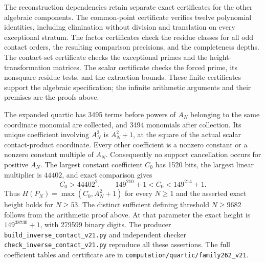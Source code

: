 \documentclass[11pt,a4paper]{article}
\begin{document}
The reconstruction dependencies retain separate exact certificates
for the other algebraic components. The common-point certificate
verifies twelve polynomial identities, including elimination without
division and translation on every exceptional stratum. The factor
certificates check the residue classes for all odd contact orders,
the resulting comparison precisions, and the completeness depths.
The contact-set certificate checks the exceptional primes and the
height-transformation matrices. The scalar certificate checks the
forced prime, its nonsquare residue tests, and the extraction bounds.
These finite certificates support the algebraic specification; the
infinite arithmetic arguments and their premises are the proofs above.

The expanded quartic has 3495 terms before powers of $A_N$ belonging
to the same coordinate monomial are collected, and 3494 monomials
after collection. Its unique coefficient involving $A_N^2$ is
$A_N^2+1$, at the square of the actual scalar contact-product coordinate.
Every other coefficient is a nonzero constant or a nonzero constant
multiple of $A_N$. Consequently no support cancellation occurs for
positive $A_N$. The largest constant coefficient $C_0$ has 1520 bits,
the largest linear multiplier is $44402$, and exact comparison
gives
\[
 C_0>44402^2,\qquad
 149^{210}+1<C_0<149^{214}+1.
\]
Thus $H(P_N)=\max(C_0,A_N^2+1)$ for every $N\ge1$ and the asserted
exact height holds for $N\ge53$. The distinct sufficient defining threshold $N\ge9682$ follows from
the arithmetic proof above. At that parameter the exact height is
$149^{38730}+1$, with 279599 binary digits. The producer
\nolinkurl{build_inverse_contact_v21.py} and independent checker
\nolinkurl{check_inverse_contact_v21.py} reproduce all these assertions. The full coefficient tables and
certificate are in \nolinkurl{computation/quartic/family262_v21}.
\end{document}
